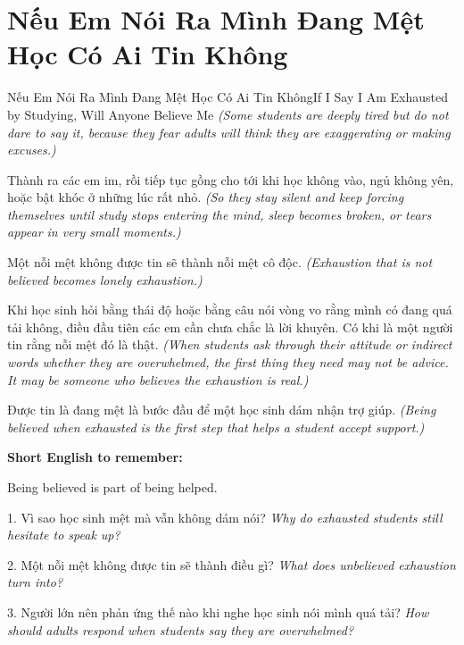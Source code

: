 \section{Nếu Em Nói Ra Mình Đang Mệt Học Có Ai Tin Không}
\begin{truyen}{Nếu Em Nói Ra Mình Đang Mệt Học Có Ai Tin Không}{If I Say I Am Exhausted by Studying, Will Anyone Believe Me}
\textit{(Some students are deeply tired but do not dare to say it, because they fear adults will think they are exaggerating or making excuses.)}

Thành ra các em im, rồi tiếp tục gồng cho tới khi học không vào, ngủ không yên, hoặc bật khóc ở những lúc rất nhỏ.
\textit{(So they stay silent and keep forcing themselves until study stops entering the mind, sleep becomes broken, or tears appear in very small moments.)}

Một nỗi mệt không được tin sẽ thành nỗi mệt cô độc.
\textit{(Exhaustion that is not believed becomes lonely exhaustion.)}

Khi học sinh hỏi bằng thái độ hoặc bằng câu nói vòng vo rằng mình có đang quá tải không, điều đầu tiên các em cần chưa chắc là lời khuyên. Có khi là một người tin rằng nỗi mệt đó là thật.
\textit{(When students ask through their attitude or indirect words whether they are overwhelmed, the first thing they need may not be advice. It may be someone who believes the exhaustion is real.)}
\end{truyen}

\begin{baihoc}
Được tin là đang mệt là bước đầu để một học sinh dám nhận trợ giúp.
\textit{(Being believed when exhausted is the first step that helps a student accept support.)}
\end{baihoc}

\begin{ghinhoanh}
\textbf{Short English to remember:}

Being believed is part of being helped.

\end{ghinhoanh}

\begin{tuhocnhanh}
1. Vì sao học sinh mệt mà vẫn không dám nói? \textit{Why do exhausted students still hesitate to speak up?}

2. Một nỗi mệt không được tin sẽ thành điều gì? \textit{What does unbelieved exhaustion turn into?}

3. Người lớn nên phản ứng thế nào khi nghe học sinh nói mình quá tải? \textit{How should adults respond when students say they are overwhelmed?}
\end{tuhocnhanh}
\ngancach
